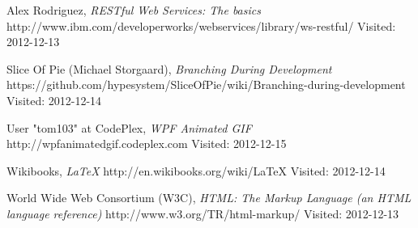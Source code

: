 \begin{thebibliography}{99}
		Alex Rodriguez,
		\emph{RESTful Web Services: The basics}\newline
		http://www.ibm.com/developerworks/webservices/library/ws-restful/\newline
		Visited: 2012-12-13
		
		Slice Of Pie (Michael Storgaard),
		\emph{Branching During Development}\newline
		https://github.com/hypesystem/SliceOfPie/wiki/Branching-during-development\newline
		Visited: 2012-12-14

		User "tom103" at CodePlex,
		\emph{WPF Animated GIF}\newline
		http://wpfanimatedgif.codeplex.com\newline
		Visited: 2012-12-15
		
		Wikibooks,
		\emph{\LaTeX}\newline
		http://en.wikibooks.org/wiki/LaTeX\newline
		Visited: 2012-12-14

		World Wide Web Consortium (W3C),
		\emph{HTML: The Markup Language (an HTML language reference)}\newline
		http://www.w3.org/TR/html-markup/\newline
		Visited: 2012-12-13
\end{thebibliography}